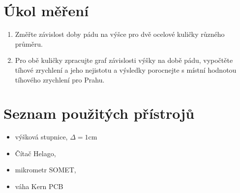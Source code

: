 \documentclass[titlepage]{article}
\begin{document}
\begin{titlepage}
	
\end{titlepage}

\tableofcontents
\newpage

\section{Úkol měření}
\begin{enumerate}
	\item Změřte závislost doby pádu na výšce pro dvě ocelové kuličky různého průměru.
	\item Pro obě kuličky zpracujte graf závislosti výšky na době pádu, vypočtěte tíhové zrychlení a jeho nejistotu a výsledky porocnejte s místní hodnotou tíhového zrychlení pro Prahu.
\end{enumerate}
\section{Seznam použitých přístrojů}
\begin{itemize}
\item výšková stupnice, $\Delta = 1\si{\centi\meter}$
\item Čítač Helago,
\item mikrometr SOMET,
\item váha Kern PCB
\end{itemize}
\end{document}
